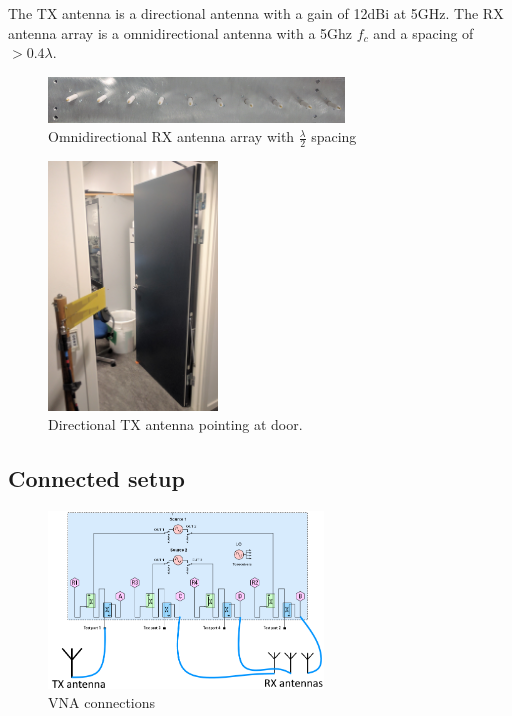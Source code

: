 The TX antenna is a directional antenna with a gain of 12dBi at 5GHz.
The RX antenna array is a omnidirectional antenna with a 5Ghz $f_c$ and a spacing of $>0.4 \lambda$.
\begin{figure}[H]
\centering
\includegraphics[width=0.7\textwidth]{pictures/Measurement/antenna_array.jpg}
    \caption{Omnidirectional RX antenna array with $\frac{\lambda}{2}$ spacing}
\end{figure}
\begin{figure}[H]
\centering
\includegraphics[width=0.4\textwidth]{pictures/Measurement/antenna_door.jpg}
\caption{Directional TX antenna pointing at door.}
\end{figure}


\label{equip}
\subsection{Connected setup}

\begin{figure}[H]
\centering
\includegraphics[width=0.65\textwidth]{figures/Gimp_figures/4portVNA.png}
\caption{VNA connections}
\label{connection_diagram}
\end{figure}

